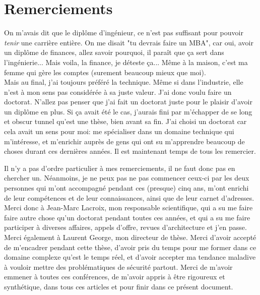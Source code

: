 
\chapter*{Remerciements}

\par
On m'avais dit que le diplôme d'ingénieur, ce n'est pas suffisant pour pouvoir
{\it tenir} une carrière entière. On me disait "tu devrais faire un MBA", car
oui, avoir un diplôme de finances, allez savoir pourquoi, il paraît que ça
sert dans l'ingénierie... Mais voila, la finance, je déteste ça... Même à la
maison, c'est ma femme qui gère les comptes (surement beaucoup mieux que
moi).\\
Mais au final, j'ai toujours préféré la technique. Même si dans l'industrie, elle
n'est à mon sens pas considérée à sa juste valeur. J'ai donc voulu faire un
doctorat. N'allez pas penser que j'ai fait un doctorat juste pour le plaisir
d'avoir un diplôme en plus. Si ça avait été le cas, j'aurais fini par
m'échapper de se long et obscur tunnel qu'est une thèse, bien avant sa fin.
J'ai choisi un doctorat car cela avait un sens pour moi: me spécialiser dans un domaine
technique qui m'intéresse, et m'enrichir auprès de gens qui ont su m'apprendre
beaucoup de choses durant ces dernières années. Il est maintenant temps de
tous les remercier.

\par
Il n'y a pas d'ordre particulier à mes remerciements, il ne faut donc pas en
chercher un. Néanmoins, je ne peux pas ne pas commencer ceux-ci par les deux
personnes qui m'ont accompagné pendant ces (presque) cinq ans, m'ont enrichi
de leur compétences et de leur connaissances, ainsi que de leur carnet
d'adresses.\\
Merci donc à {\sc Jean-Marc Lacroix}, mon responsable scientifique, qui a su
me faire faire autre chose qu'un doctorat pendant toutes ces années, et qui a
su me faire participer à diverses affaires, appels d'offre, revues
d'architecture et j'en passe.\\
Merci également à {\sc Laurent George}, mon directeur de thèse. Merci d'avoir
accepté de m'encadrer pendant cette thèse, d'avoir pris du temps pour me
former dans ce domaine complexe qu'est le temps réel, et d'avoir accepter ma
tendance maladive à vouloir mettre des problématiques de sécurité partout.
Merci de m'avoir emmener à toutes ces conférences, de m'avoir appris à être
rigoureux et synthétique, dans tous ces articles et pour finir dans ce présent
document.

